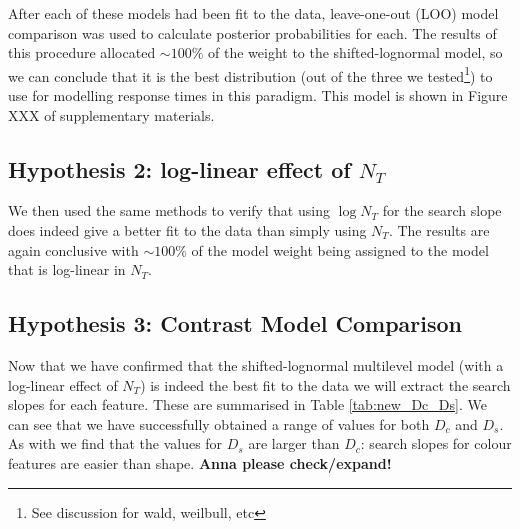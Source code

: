 \documentclass[preprint,12pt,authoryear]{elsarticle}
\begin{document}
After each of these models had been fit to the data, leave-one-out (LOO) model comparison was used to calculate posterior probabilities for each. The results of this procedure allocated $\sim100\%$ of the weight to the shifted-lognormal model, so we can conclude that it is the best distribution (out of the three we tested\footnote{See discussion for wald, weilbull, etc}) to use for modelling response times in this paradigm. This model is shown in Figure XXX of supplementary materials.


\subsection{Hypothesis 2: log-linear effect of $N_T$}

We then used the same methods to verify that using $\log{N_T}$ for the search slope does indeed give a better fit to the data than simply using $N_T$. The results are again conclusive with $\sim100\%$ of the model weight being assigned to the model that is log-linear in $N_T$. 

\subsection{Hypothesis 3: Contrast Model Comparison}

Now that we have confirmed that the shifted-lognormal multilevel model (with a log-linear effect of $N_T$) is indeed the best fit to the data we will extract the search slopes for each feature. These are summarised in Table \ref{tab:new_Dc_Ds}. We can see that we have successfully obtained a range of values for both $D_c$ and $D_s$. As with \cite{buetti2019predicting} we find that the values for $D_s$ are larger than $D_c$: search slopes for colour features are easier than shape. \textbf{Anna please check/expand!}
\end{document}

